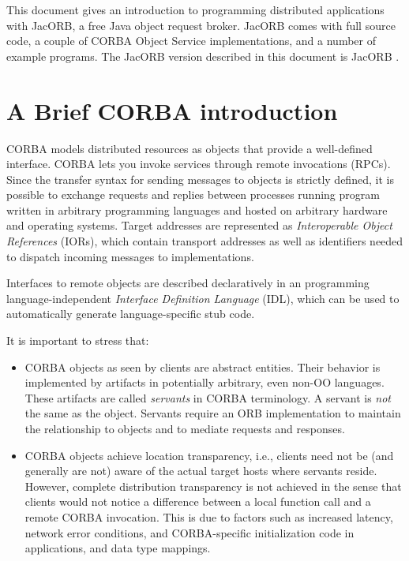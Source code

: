 %
%

This document gives an introduction to programming distributed
applications with JacORB, a free Java object request broker. JacORB
comes with full source code, a couple of CORBA Object Service
implementations, and a number of example programs.  The JacORB version
described in this document is JacORB \JacORBVersion.

\section{A Brief CORBA introduction}

CORBA models distributed resources as objects that provide a
well-defined interface. CORBA lets you invoke services through remote
invocations (RPCs). Since the transfer syntax for sending messages to
objects is strictly defined, it is possible to exchange requests and
replies between processes running program written in arbitrary
programming languages and hosted on arbitrary hardware and operating
systems. Target addresses are represented as {\em Interoperable Object
References} (IORs), which contain transport addresses as well as
identifiers needed to dispatch incoming messages to implementations.

Interfaces to remote objects are described declaratively in an
programming language-independent {\em Interface Definition Language}
(IDL), which can be used to automatically generate language-specific
stub code.

It is important to stress that:
\begin{itemize}
\item CORBA objects as seen by clients are abstract entities. Their
  behavior is implemented by artifacts in potentially arbitrary, even
  non-OO languages. These artifacts are called {\em servants} in CORBA
  terminology. A servant is {\em not} the same as the object. Servants
  require an ORB implementation to maintain the relationship to
  objects and to mediate requests and responses.
\item CORBA objects achieve location transparency, i.e., clients need
  not be (and generally are not) aware of the actual target hosts
  where servants reside. However, complete distribution transparency
  is not achieved in the sense that clients would not notice a
  difference between a local function call and a remote CORBA
  invocation. This is due to factors such as increased latency,
  network error conditions, and CORBA-specific initialization code in
  applications, and data type mappings.
\end{itemize}

